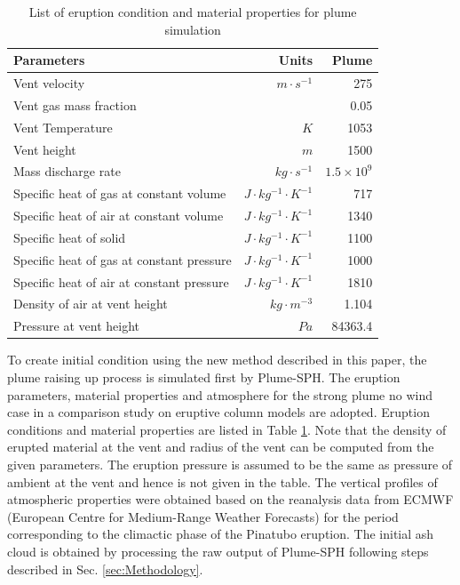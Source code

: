 \documentclass[draft,linenumbers]{agujournal2019}
\begin{document}
\begin{table}[htp]
	\centering
      \caption{List of eruption condition and material properties for plume simulation}		
	  \begin{tabular}{lrr}
	    \hline
	    Parameters & Units & Plume \\
	    \hline
	    Vent velocity          & $m\cdot s^{-1}$  & 275 \\
	    Vent gas mass fraction &                  & 0.05 \\
	    Vent Temperature       & $K$              & 1053 \\
	    Vent height            & $m$              & 1500 \\
	    Mass discharge rate    & $kg\cdot s^{-1}$ & $1.5 \times 10^9$\\
	    	Specific heat of gas at constant volume     & $J \cdot kg^{-1}\cdot K^{-1}$ & 717     \\
	    Specific heat of air at constant volume     & $J \cdot kg^{-1}\cdot K^{-1}$ & 1340    \\
	    	Specific heat of solid                      & $J \cdot kg^{-1}\cdot K^{-1}$ & 1100    \\
	    	Specific heat of gas at constant pressure   & $J \cdot kg^{-1}\cdot K^{-1}$ & 1000    \\
	    	Specific heat of air at constant pressure   & $J \cdot kg^{-1}\cdot K^{-1}$ & 1810    \\
	    	Density of air at vent height               & $kg \cdot m^{-3}$       & 1.104   \\
	    Pressure at vent height                     & $Pa$                    & 84363.4 \\
	    \hline
	  \end{tabular}
	  \label{tab:input_parameters_plume_simulation}
\end{table}

To create initial condition using the new method described in this paper, the plume raising up process is simulated first by Plume-SPH. The eruption parameters, material properties and atmosphere for the strong plume no wind case in a comparison study on eruptive column models \citep {costa2016results} are adopted. Eruption conditions and material properties are listed in Table \ref{tab:input_parameters_plume_simulation}. Note that the density of erupted material at the vent and radius of the vent can be computed from the given parameters. The eruption pressure is assumed to be the same as pressure of ambient at the vent and hence is not given in the table. The vertical profiles of atmospheric properties were obtained based on the reanalysis data from ECMWF (European Centre for Medium-Range Weather Forecasts) for the period corresponding to the climactic phase of the Pinatubo eruption. The initial ash cloud is obtained by processing the raw output of Plume-SPH following steps described in Sec. \ref{sec:Methodology}.
\end{document}
